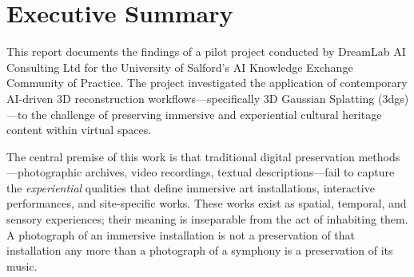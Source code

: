 \documentclass[a4paper,11pt,twoside,openright]{report}
\begin{document}
\begin{titlepage}
\end{titlepage}


\chapter*{Executive Summary}

This report documents the findings of a pilot project conducted by DreamLab AI Consulting Ltd for the University of Salford's AI Knowledge Exchange Community of Practice. The project investigated the application of contemporary AI-driven 3D reconstruction workflows---specifically 3D Gaussian Splatting (\acrshort{3dgs})---to the challenge of preserving immersive and experiential cultural heritage content within virtual spaces.

The central premise of this work is that traditional digital preservation methods---photographic archives, video recordings, textual descriptions---fail to capture the \emph{experiential} qualities that define immersive art installations, interactive performances, and site-specific works. These works exist as spatial, temporal, and sensory experiences; their meaning is inseparable from the act of inhabiting them. A photograph of an immersive installation is not a preservation of that installation any more than a photograph of a symphony is a preservation of its music.
\end{document}
